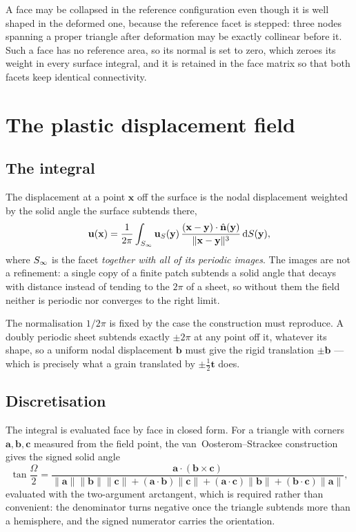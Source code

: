 A face may be collapsed in the reference configuration even though it is well
shaped in the deformed one, because the reference facet is stepped: three nodes
spanning a proper triangle after deformation may be exactly collinear before it.
Such a face has no reference area, so its normal is set to zero, which zeroes its
weight in every surface integral, and it is retained in the face matrix so that
both facets keep identical connectivity.

\section*{The plastic displacement field}

\subsection*{The integral}

The displacement at a point $\mathbf{x}$ off the surface is the nodal
displacement weighted by the solid angle the surface subtends there,
\begin{equation}
  \mathbf{u}(\mathbf{x})
  = \frac{1}{2\pi}\int_{S_{\infty}}
    \mathbf{u}_S(\mathbf{y})\,
    \frac{(\mathbf{x}-\mathbf{y})\cdot\hat{\mathbf{n}}(\mathbf{y})}
         {\lVert \mathbf{x}-\mathbf{y} \rVert^{3}}\,
    \mathrm{d}S(\mathbf{y}) ,
  \label{eq:field}
\end{equation}
where $S_{\infty}$ is the facet \emph{together with all of its periodic images}. The
images are not a refinement: a single copy of a finite patch subtends a solid
angle that decays with distance instead of tending to the $2\pi$ of a sheet, so
without them the field neither is periodic nor converges to the right limit.

The normalisation $1/2\pi$ is fixed by the case the construction must reproduce.
A doubly periodic sheet subtends exactly $\pm 2\pi$ at any point off it,
whatever its shape, so a uniform nodal displacement $\mathbf{b}$ must give the
rigid translation $\pm\mathbf{b}$ --- which is precisely what a grain translated
by $\pm\tfrac{1}{2}\mathbf{t}$ does.

\subsection*{Discretisation}

The integral is evaluated face by face in closed form. For a triangle with
corners $\mathbf{a},\mathbf{b},\mathbf{c}$ measured from the field point, the
van~Oosterom--Strackee construction gives the signed solid angle
\begin{equation}
  \tan\frac{\Omega}{2}
  = \frac{\mathbf{a}\cdot(\mathbf{b}\times\mathbf{c})}
         {\lVert\mathbf{a}\rVert\lVert\mathbf{b}\rVert\lVert\mathbf{c}\rVert
          + (\mathbf{a}\cdot\mathbf{b})\lVert\mathbf{c}\rVert
          + (\mathbf{a}\cdot\mathbf{c})\lVert\mathbf{b}\rVert
          + (\mathbf{b}\cdot\mathbf{c})\lVert\mathbf{a}\rVert} ,
  \label{eq:vos}
\end{equation}
evaluated with the two-argument arctangent, which is required rather than
convenient: the denominator turns negative once the triangle subtends more than
a hemisphere, and the signed numerator carries the orientation.

